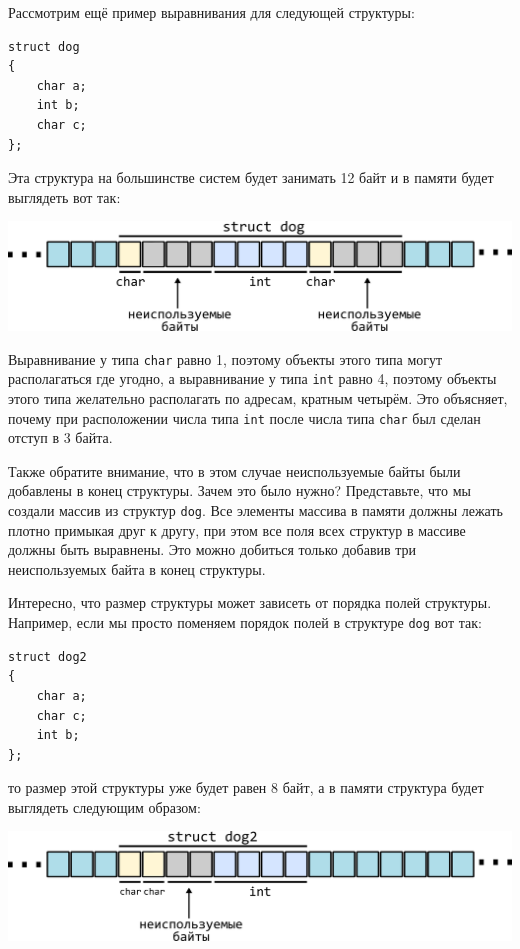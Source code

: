 \documentclass{article}
\begin{document}
\newpage
Рассмотрим ещё пример выравнивания для следующей структуры:
\begin{lstlisting}
struct dog 
{
    char a;
    int b;
    char c;
};
\end{lstlisting}
Эта структура на большинстве систем будет занимать 12 байт и в памяти будет выглядеть вот так:
\begin{center}
\includegraphics[scale=1]{../images/alignment2.png}
\end{center}

Выравнивание у типа \texttt{char} равно 1, поэтому объекты этого типа могут располагаться где угодно, а выравнивание у типа \texttt{int} равно 4, поэтому объекты этого типа желательно располагать по адресам, кратным четырём. Это объясняет, почему при расположении числа типа \texttt{int} после числа типа \texttt{char} был сделан отступ в 3 байта.

Также обратите внимание, что в этом случае неиспользуемые байты были добавлены в конец структуры. Зачем это было нужно? Представьте, что мы создали массив из структур \texttt{dog}. Все элементы массива в памяти должны лежать плотно примыкая друг к другу, при этом все поля всех структур в массиве должны быть выравнены. Это можно добиться только добавив три неиспользуемых байта в конец структуры.

Интересно, что размер структуры может зависеть от порядка полей структуры. Например, если мы просто поменяем порядок полей в структуре \texttt{dog} вот так:
\begin{lstlisting}
struct dog2 
{
    char a;
    char c;
    int b;
};
\end{lstlisting}
то размер этой структуры уже будет равен 8 байт, а в памяти структура будет выглядеть следующим образом:
\begin{center}
\includegraphics[scale=1]{../images/alignment3.png}
\end{center}
\end{document}
